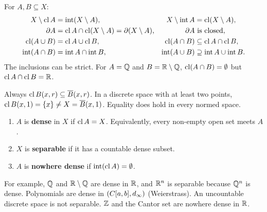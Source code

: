 \begin{proposition}\label{prop:identities}
For $A,B\subseteq X$:
\begin{align*}
  X\setminus\operatorname{cl} A&=\operatorname{int}(X\setminus A), & X\setminus\operatorname{int} A&=\operatorname{cl}(X\setminus A),\\
  \partial A&=\operatorname{cl} A\cap\operatorname{cl}(X\setminus A)=\partial(X\setminus A), & \partial A&\ \text{is closed},\\
  \operatorname{cl}(A\cup B)&=\operatorname{cl} A\cup\operatorname{cl} B, & \operatorname{cl}(A\cap B)&\subseteq\operatorname{cl} A\cap\operatorname{cl} B,\\
  \operatorname{int}(A\cap B)&=\operatorname{int} A\cap\operatorname{int} B, & \operatorname{int}(A\cup B)&\supseteq\operatorname{int} A\cup\operatorname{int} B.
\end{align*}
The inclusions can be strict. For $A=\mathbb{Q}$ and $B=\mathbb{R}\setminus\mathbb{Q}$, $\operatorname{cl}(A\cap B)=\emptyset$ but $\operatorname{cl} A\cap\operatorname{cl} B=\mathbb{R}$.
\end{proposition}

\begin{warning}[$\cl\Bo(x,r)\ne\Bc(x,r)$ in general]
Always $\operatorname{cl}B(x,r)\subseteq\overline{B}(x,r)$. In a discrete space with at least two points, $\operatorname{cl}B(x,1)=\{x\}\ne X=\overline{B}(x,1)$. Equality does hold in every normed space.
\end{warning}

\begin{definition}\label{def:dense}
\leavevmode
\begin{enumerate}[label=(\roman*)]
  \item $A$ is \textbf{dense} in $X$ if $\operatorname{cl} A=X$. Equivalently, every non-empty open set meets $A$.
  \item $X$ is \textbf{separable} if it has a countable dense subset.
  \item $A$ is \textbf{nowhere dense} if $\operatorname{int}(\operatorname{cl} A)=\emptyset$.
\end{enumerate}
\end{definition}
For example, $\mathbb{Q}$ and $\mathbb{R}\setminus\mathbb{Q}$ are dense in $\mathbb{R}$, and $\mathbb{R}^n$ is separable because $\mathbb{Q}^n$ is dense. Polynomials are dense in $(C[a,b],d_\infty)$ (Weierstrass). An uncountable discrete space is not separable. $\mathbb{Z}$ and the Cantor set are nowhere dense in $\mathbb{R}$.

